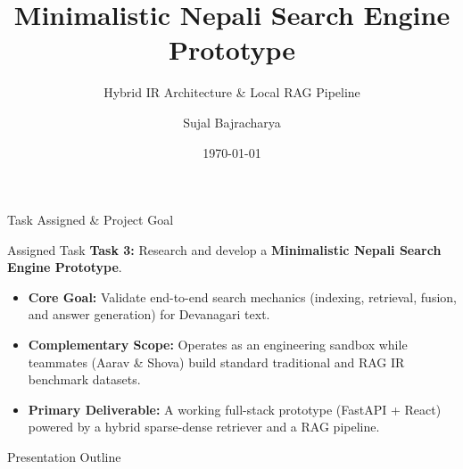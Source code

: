 \documentclass[aspectratio=169]{beamer}
\title[Nepali Search Prototype]{Minimalistic Nepali Search Engine Prototype}
\subtitle{Hybrid IR Architecture \& Local RAG Pipeline}
\author[Sujal Bajracharya]{Sujal Bajracharya}
\institute[KU]{Kathmandu University}
\date{\today}
\begin{document}
\begin{frame}
  \titlepage
\end{frame}

\begin{frame}{Task Assigned \& Project Goal}
  \begin{block}{Assigned Task}
    \textbf{Task 3:} Research and develop a \textbf{Minimalistic Nepali Search Engine Prototype}.
  \end{block}
  \vspace{0.3cm}
  \begin{itemize}
    \item \textbf{Core Goal:} Validate end-to-end search mechanics (indexing, retrieval, fusion, and answer generation) for Devanagari text.
    \item \textbf{Complementary Scope:} Operates as an engineering sandbox while teammates (Aarav \& Shova) build standard traditional and RAG IR benchmark datasets.
    \item \textbf{Primary Deliverable:} A working full-stack prototype (FastAPI + React) powered by a hybrid sparse-dense retriever and a RAG pipeline.
  \end{itemize}
\end{frame}

\begin{frame}{Presentation Outline}
  \tableofcontents
\end{frame}

\end{document}
